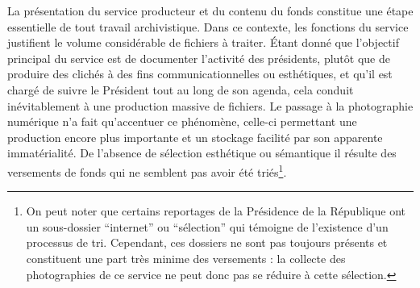 La présentation du service producteur et du contenu du fonds constitue une étape essentielle de tout travail archivistique. Dans ce contexte, les fonctions du service justifient le volume considérable de fichiers à traiter. Étant donné que l'objectif principal du service est de documenter l'activité des présidents, plutôt que de produire des clichés à des fins communicationnelles ou esthétiques, et qu'il est chargé de suivre le Président tout au long de son agenda, cela conduit inévitablement à une production massive de fichiers. Le passage à la photographie numérique n'a fait qu'accentuer ce phénomène, celle-ci permettant une production encore plus importante et un stockage facilité par son apparente immatérialité. De l'absence de sélection esthétique ou sémantique il résulte des versements de fonds qui ne semblent pas avoir été triés\footnote{On peut noter que certains reportages de la Présidence de la République ont un sous-dossier \enquote{internet} ou \enquote{sélection} qui témoigne de l'existence d'un processus de tri. Cependant, ces dossiers ne sont pas toujours présents et constituent une part très minime des versements :  la collecte des photographies de ce service ne peut donc pas se réduire à cette sélection.}.
